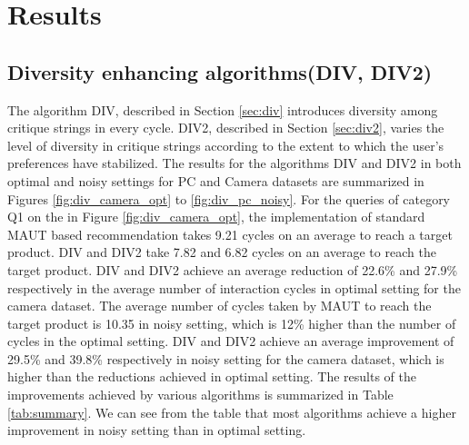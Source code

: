 \section{Results}
\subsection{Diversity enhancing algorithms(DIV, DIV2)}
\label{sec:div_results}
The algorithm DIV, described in Section \ref{sec:div} introduces diversity among critique strings in every cycle. 
DIV2, described in Section \ref{sec:div2}, varies the level of diversity in critique strings according to the extent to which the user's preferences have stabilized.
The results for the algorithms DIV and DIV2 in both optimal and noisy settings for PC and Camera datasets are summarized in Figures \ref{fig:div_camera_opt} to \ref{fig:div_pc_noisy}.
For the queries of category Q1 on the in Figure \ref{fig:div_camera_opt}, the implementation of standard MAUT based recommendation takes 9.21 cycles on an average to reach a target product.
DIV and DIV2 take 7.82 and 6.82 cycles on an average to reach the target product.
DIV and DIV2 achieve an average reduction of 22.6\% and 27.9\% respectively in the average number of interaction cycles in optimal setting for the camera dataset.
The average number of cycles taken by MAUT to reach the target product is 10.35 in noisy setting, which is 12\% higher than the number of cycles in the optimal setting.
DIV and DIV2 achieve an average improvement of 29.5\% and 39.8\% respectively in noisy setting for the camera dataset, which is higher than the reductions achieved in optimal setting.
The results of the improvements achieved by various algorithms is summarized in Table \ref{tab:summary}.
We can see from the table that most algorithms achieve a higher improvement in noisy setting than in optimal setting.



